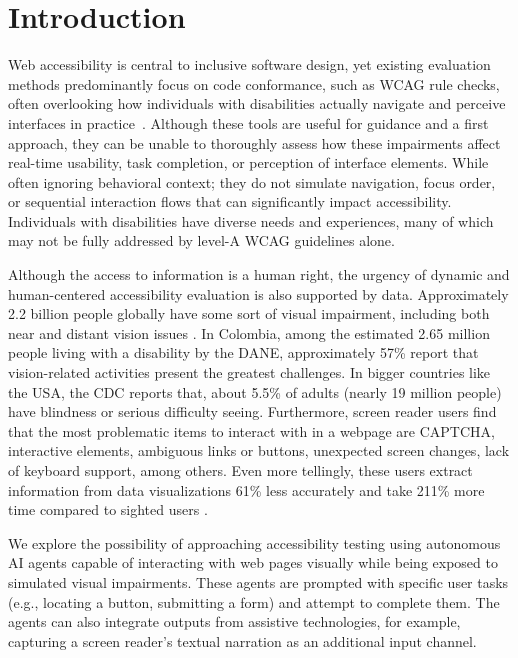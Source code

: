 
\section{Introduction}

Web accessibility is central to inclusive software design, yet existing evaluation methods predominantly focus on code conformance, such as \ac{WCAG} rule checks, often overlooking how individuals with disabilities actually navigate and perceive interfaces in practice~\cite{ara2024inclusive}. Although these tools are useful for guidance and a first approach, they can be unable to thoroughly assess how these impairments affect real-time usability, task completion, or perception of interface elements. While often ignoring behavioral context; they do not simulate navigation, focus order, or sequential interaction flows that can significantly impact accessibility. Individuals with disabilities have diverse needs and experiences, many of which may not be fully addressed by level-A \ac{WCAG} guidelines alone.

Although the access to information is a human right, the urgency of dynamic and human-centered accessibility evaluation is also supported by data. Approximately 2.2 billion people globally have some sort of visual impairment, including both near and distant vision issues \cite{who2023vision}. In Colombia, among the estimated 2.65 million people living with a disability by the DANE, approximately 57\% report that vision-related activities present the greatest challenges\cite{DANE2022}. In bigger countries like the USA, the CDC reports that, about 5.5\% of adults (nearly 19 million people) have blindness or serious difficulty seeing\cite{cdc2025disabilities}. Furthermore, screen reader users find that the most problematic items to interact with in a webpage are CAPTCHA, interactive elements, ambiguous links or buttons, unexpected screen changes, lack of keyboard support, among others\cite{webaimsurvey2025}. Even more tellingly, these users extract information from data visualizations 61\% less accurately and take 211\% more time compared to sighted users \cite{wobbrock2021assets}.

We explore the possibility of approaching accessibility testing using autonomous \ac{AI} agents capable of interacting with web pages visually while being exposed to simulated visual impairments. These agents are prompted with specific user tasks (e.g., locating a button, submitting a form) and attempt to complete them. The agents can also integrate outputs from assistive technologies, for example, capturing a screen reader's textual narration as an additional input channel. 

